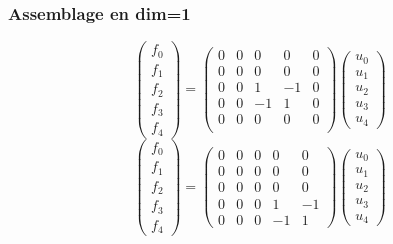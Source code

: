 \documentclass{beamer}
\begin{document}
\begin{frame}
\frametitle{Assemblage en dim=1}
\[\left(\begin{array}{c} 
f_{0}\\f_{1}\\f_{2}\\f_{3}\\f_{4}
\end{array}\right)=\left(\begin{array}{rrrrr} 
0&0&0&0&0\\
0&0&0&0&0\\
0&0&1&-1&0\\0&0&-1&1&0\\
0&0&0&0&0\\

\end{array}\right) \left(\begin{array}{l} 
u_{0}\\u_{1}\\u_{2}\\u_{3}\\u_{4}
\end{array}\right)
\]
\[\left(\begin{array}{c} 
f_{0}\\f_{1}\\f_{2}\\f_{3}\\f_{4}
\end{array}\right)=\left(\begin{array}{rrrrr} 
0&0&0&0&0\\
0&0&0&0&0\\
0&0&0&0&0\\
0&0&0&1&-1\\0&0&0&-1&1
\end{array}\right) \left(\begin{array}{l} 
u_{0}\\u_{1}\\u_{2}\\u_{3}\\u_{4}
\end{array}\right)
\]
\end{frame}
\end{document}
